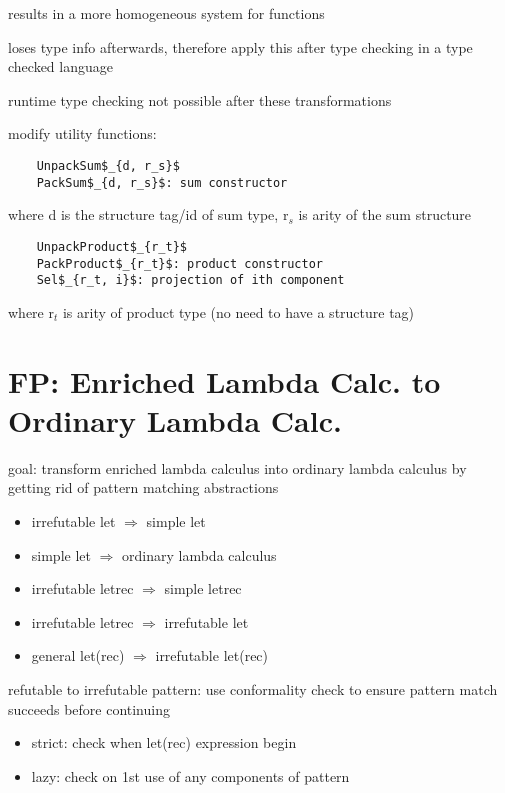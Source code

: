 \documentclass[8pt]{extarticle}
\begin{document}
\begin{multicols*}{2}
  results in a more homogeneous system for functions

  loses type info afterwards, therefore apply this after type checking in a type checked language

  runtime type checking not possible after these transformations

  modify utility functions:

  \begin{lstlisting}
    UnpackSum$_{d, r_s}$
    PackSum$_{d, r_s}$: sum constructor
  \end{lstlisting}
  where d is the structure tag/id of sum type, r$_s$ is arity of the sum structure

  \begin{lstlisting}
    UnpackProduct$_{r_t}$
    PackProduct$_{r_t}$: product constructor
    Sel$_{r_t, i}$: projection of ith component
  \end{lstlisting}

  where r$_t$ is arity of product type (no need to have a structure tag)
  
  \vfill\null
  \columnbreak

  \section{FP: Enriched Lambda Calc. to Ordinary Lambda Calc.}

  goal: transform enriched lambda calculus into ordinary lambda calculus by getting rid of pattern matching abstractions
  
  \begin{itemize}
  \item irrefutable let $\Rightarrow$ simple let
  \item simple let $\Rightarrow$ ordinary lambda calculus
  \item irrefutable letrec $\Rightarrow$ simple letrec
  \item irrefutable letrec $\Rightarrow$ irrefutable let
  \item general let(rec) $\Rightarrow$ irrefutable let(rec)
  \end{itemize}

  refutable to irrefutable pattern: use conformality check to ensure pattern match succeeds before continuing
  \begin{itemize}
  \item strict: check when let(rec) expression begin
  \item lazy: check on 1st use of any components of pattern
  \end{itemize}
  

\end{multicols*}
\end{document}
